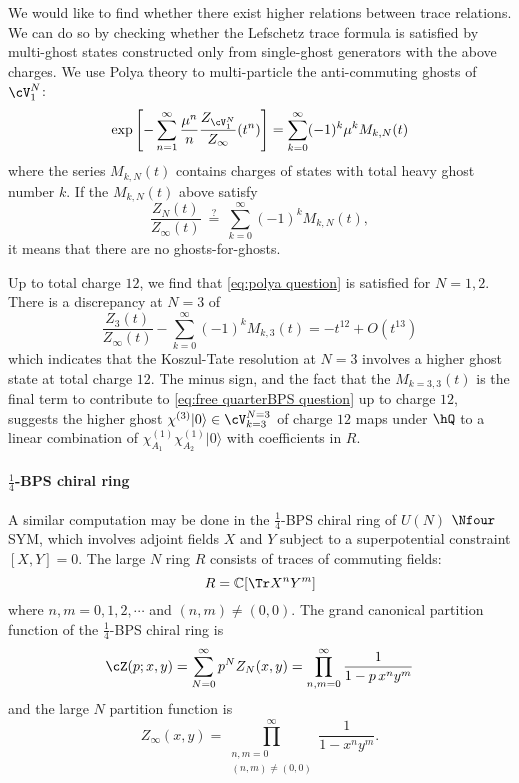 \documentclass[a4paper,12pt]{article}
\begin{document}
We would like to find whether there exist higher relations between trace relations. We can do so by checking whether the Lefschetz trace formula is satisfied by multi-ghost states constructed only from single-ghost generators with the above charges. We use Polya theory \cite{Sundborg:1999ue,Polyakov:2001af,Aharony:2003sx} to multi-particle the anti-commuting ghosts of $\cV_1^N$:
\begin{equation}
\exp\left[ - \sum_{n=1}^\infty \frac{\mu^n}{n} \frac{Z_{\cV_1^{N}}}{Z_\infty}(t^n) \right] = \sum_{k=0}^\infty (-1)^k \mu^k M_{k, N} (t)
\end{equation}
where the series $M_{k, N} (t)$ contains charges of states with total heavy ghost number $k$. If the $M_{k, N} (t)$ above satisfy
\begin{equation} \label{eq:polya question}
\frac{Z_N(t)}{Z_\infty(t)} \ \stackrel{?}{=} \ \sum_{k=0}^\infty (-1)^k M_{k, N} (t),
\end{equation}
it means that there are no ghosts-for-ghosts.

Up to total charge $12$, we find that \eqref{eq:polya question} is satisfied for $N=1,2$. There is a discrepancy at $N=3$ of
\begin{equation} \label{eq:free quarterBPS question}
\frac{Z_3(t)}{Z_\infty(t)} - \sum_{k=0}^\infty (-1)^k M_{k, 3} (t) = - t^{12} + O(t^{13})
\end{equation}
which indicates that the Koszul-Tate resolution at $N=3$ involves a higher ghost state at total charge $12$. The minus sign, and the fact that the $M_{k=3, 3} (t)$ is the final term to contribute to \eqref{eq:free quarterBPS question} up to charge $12$, suggests the higher ghost $\chi^{(3)}|0\rangle \in \cV_{k=3}^{N=3}$ of charge $12$ maps under $\hQ$ to a linear combination of $\chi_{A_1}^{(1)} \chi_{A_2}^{(1)} |0\rangle$ with coefficients in $R$.

\paragraph{$\frac{1}{4}$-BPS chiral ring}

A similar computation may be done in the $\frac{1}{4}$-BPS chiral ring of $U(N)$ $\Nfour$ SYM, which involves adjoint fields $X$ and $Y$ subject to a superpotential constraint $[X,Y]=0$. The large $N$ ring $R$ consists of traces of commuting fields:
\begin{equation}
R = \mathbb{C}[ \Tr X^n Y^m ]
\end{equation}
where $n,m=0,1,2, \cdots$ and $(n,m) \neq (0,0)$. The grand canonical partition function of the $\frac{1}{4}$-BPS chiral ring is
\begin{equation}
\cZ(p; x,y) = \sum_{N=0}^\infty p^N Z_N(x,y) = \prod_{n,m=0}^\infty \frac{1}{1 - p \, x^n y^m}
\end{equation}
and the large $N$ partition function is
\begin{equation}
Z_\infty (x,y) = \prod_{\substack{n,m=0 \\ (n,m) \neq (0,0)}}^\infty \frac{1}{1 - x^n y^m}.
\end{equation}
\end{document}
